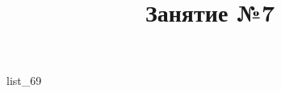 \documentclass[12pt, a4paper]{article}
\begin{document}
	\title{Занятие №7}
	{list_69}
\end{document}

